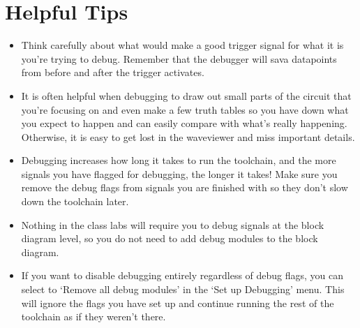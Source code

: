 \documentclass{article}
\begin{document}
\section{Helpful Tips}
\begin{itemize}
\item Think carefully about what would make a good trigger signal for
  what it is you're trying to debug.  Remember that the debugger will
  sava datapoints from before and after the trigger activates.
\item It is often helpful when debugging to draw out small parts of
  the circuit that you're focusing on and even make a few truth tables
  so you have down what you expect to happen and can easily compare
  with what's really happening.  Otherwise, it is easy to get lost in
  the waveviewer and miss important details.
\item Debugging increases how long it takes to run the toolchain, and
  the more signals you have flagged for debugging, the longer it
  takes!  Make sure you remove the debug flags from signals you are
  finished with so they don't slow down the toolchain later.
\item Nothing in the class labs will require you to debug signals at
  the block diagram level, so you do not need to add debug modules to
  the block diagram.
\item If you want to disable debugging entirely regardless of debug
  flags, you can select to `Remove all debug modules' in the `Set up
  Debugging' menu.  This will ignore the flags you have set up and
  continue running the rest of the toolchain as if they weren't there.  
\end{itemize}
	
\end{document}
